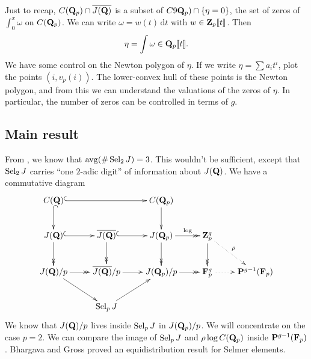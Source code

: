 Just to recap, $C(\mathbf{Q}_p)\cap \overline{J(\mathbf{Q})}$ is a subset of 
$C9\mathbf{Q}_p)\cap \{\eta=0\}$, the set of zeros of $\int_0^x \omega$ on 
$C(\mathbf{Q}_p)$. We can write $\omega=w(t)\, \mathrm{d}t$ with 
$w\in \mathbf{Z}_p\llbracket t\rrbracket$. Then 
\[
  \eta = \int \omega \in \mathbf{Q}_p\llbracket t\rrbracket .
\]
We have some control on the Newton polygon of $\eta$. If we write 
$\eta = \sum a_i t^i$, plot the points $(i,v_p(i))$. The lower-convex hull 
of these points is the Newton polygon, and from this we can understand the 
valuations of the zeros of $\eta$. In particular, the number of zeros can 
be controlled in terms of $g$. 





\subsection{Main result}

From \cite{bg13}, we know that $\operatorname{avg}(\#\operatorname{Sel}_2 J)=3$. This wouldn't be 
sufficient, except that $\operatorname{Sel}_2 J$ carries ``one $2$-adic digit'' of 
information about $J(\mathbf{Q})$. We have a commutative diagram 
\[\xymatrix{
  C(\dQ) \ar@{^{(}->}[d] \ar@{^{(}->}[rr] 
    & & C(\dQ_p) \ar[d] \\
  J(\dQ) \ar@{^{(}->}[r] \ar@{->>}[d] 
    & \overline{J(\dQ)} \ar@{^{(}->}[r] \ar@{->>}[d] 
    & J(\dQ_p) \ar@{->>}[r]^-{\log} \ar@{->>}[d] 
    & \dZ_p^g \ar@{->>}[d] \ar@{.>}[dr]^-\rho \\
  J(\dQ)/p \ar@{->>}[r] \ar[dr] 
    & \overline{J(\dQ)}/p \ar[r] 
    & J(\dQ_p)/p \ar@{->>}[r] 
    & \dF_p^g \ar@{.>}[r] 
    & \dP^{g-1}(\dF_p) \\
  & \selmer_p J \ar[ur] 
}\]
We know that $J(\mathbf{Q})/p$ lives inside $\operatorname{Sel}_p J$ in $J(\mathbf{Q}_p)/p$. We will 
concentrate on the case $p=2$. We can compare the image of $\operatorname{Sel}_p J$ and 
$\rho\log C(\mathbf{Q}_p)$ inside $\mathbf{P}^{g-1}(\mathbf{F}_p)$. Bhargava and Gross proved an 
equidistribution result for Selmer elements. 




